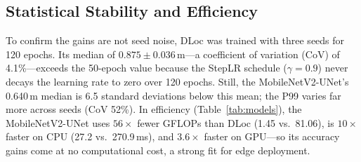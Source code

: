 \documentclass[conference,a4paper]{IEEEtran}
\begin{document}
\begin{table}[t]
\caption{Zero-Shot Cross-Session Accuracy (July-Only Training). Cells: Median\,/\,P90 (m); Best in \textbf{Bold}.}
\label{tab:zeroshot}
\centering
\scriptsize
\setlength{\tabcolsep}{3pt}
\end{table}

\subsection{Statistical Stability and Efficiency}
To confirm the gains are not seed noise, DLoc was trained with three seeds for 120 epochs. Its median of $0.875 \pm 0.036$\,m---a coefficient of variation (CoV) of 4.1\%---exceeds the 50-epoch value because the StepLR schedule ($\gamma{=}0.9$) never decays the learning rate to zero over 120 epochs. Still, the MobileNetV2-UNet's 0.640\,m median is 6.5 standard deviations below this mean; the P99 varies far more across seeds (CoV 52\%). In efficiency (Table~\ref{tab:models}), the MobileNetV2-UNet uses $56\times$ fewer GFLOPs than DLoc (1.45 vs.\ 81.06), is $10\times$ faster on CPU (27.2 vs.\ 270.9\,ms), and $3.6\times$ faster on GPU---so its accuracy gains come at no computational cost, a strong fit for edge deployment.
\end{document}

